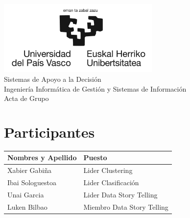\documentclass{report}
\begin{document}
    \begin{titlepage}
        \centering
        \includegraphics[width=0.6\textwidth]{./img/logo.jpg}\\
        \vspace{1cm}
        \LARGE Sistemas de Apoyo a la Decisión\\
        \vspace{0.5cm}
        \Large Ingeniería Informática de Gestión y Sistemas de Información\\
        \vspace{3cm}
        \Huge Acta de Grupo\\
        \vspace{2.5cm}
    \end{titlepage}
    \chapter{Participantes}
    \begin{center}
        \begin{longtable}{|p{6cm}|p{6cm}|}
            \hline
            \textbf{Nombres y Apellido} & \textbf{Puesto}\\
            \hline
            Xabier Gabiña & Lider Clustering\\
            \hline
            Ibai Sologuestoa & Lider Clasificación\\
            \hline
            Unai Garcia & Lider Data Story Telling\\
            \hline
            Luken Bilbao & Miembro Data Story Telling\\
            \hline
        \end{longtable}
    \end{center}
\end{document}
